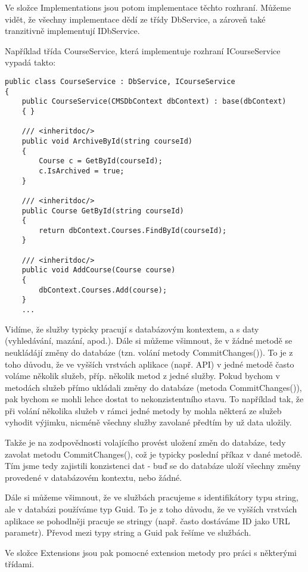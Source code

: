Ve složce Implementations jsou potom implementace těchto rozhraní. Můžeme vidět, že všechny implementace dědí ze třídy DbService, a zároveň také tranzitivně implementují IDbService.

Například třída CourseService, která implementuje rozhraní ICourseService vypadá takto:

\begin{lstlisting}
public class CourseService : DbService, ICourseService
{
	public CourseService(CMSDbContext dbContext) : base(dbContext)
	{ }
	
	/// <inheritdoc/>
	public void ArchiveById(string courseId)
	{
		Course c = GetById(courseId);
		c.IsArchived = true;
	}
	
	/// <inheritdoc/>
	public Course GetById(string courseId)
	{
		return dbContext.Courses.FindById(courseId);
	}
	
	/// <inheritdoc/>
	public void AddCourse(Course course)
	{
		dbContext.Courses.Add(course);
	}
	...
\end{lstlisting}

Vidíme, že služby typicky pracují s databázovým kontextem, a s daty (vyhledávání, mazání, apod.).
Dále si můžeme všimnout, že v žádné metodě se neukládájí změny do databáze (tzn. volání metody CommitChanges()). To je z toho důvodu, že ve vyšších vrstvách aplikace (např. API) v jedné metodě často voláme několik služeb, příp. několik metod z jedné služby. 
Pokud bychom v metodách služeb přímo ukládali změny do databáze (metoda CommitChanges()), pak bychom se mohli lehce dostat to nekonzistentního stavu. To například tak, že při volání několika služeb v rámci jedné metody by 
mohla některá ze služeb vyhodit výjimku, nicméně všechny služby zavolané předtím by už data uložily.

Takže je na zodpovědnosti volajícího provést uložení změn do databáze, tedy zavolat metodu CommitChanges(), což je typicky poslední příkaz v dané metodě.
Tím jsme tedy zajistili konzistenci dat - buď se do databáze uloží všechny změny provedené v databázovém kontextu, nebo žádné.

Dále si můžeme všimnout, že ve službách pracujeme s identifikátory typu string, ale v databázi používáme typ Guid. To je z toho důvodu, že ve vyšších vrstvách aplikace se pohodlněji pracuje se stringy (např. často dostáváme ID jako URL parametr). Převod mezi typy string a Guid pak řešíme ve službách.

Ve složce Extensions jsou pak pomocné extension metody pro práci s některými třídami.

